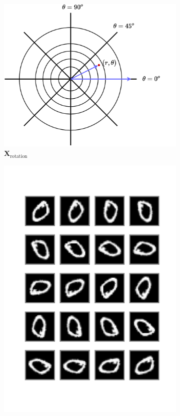 \documentclass[../../book-main.tex]{subfiles}
\begin{document}
\begin{example}
\begin{figure}[t]
    \begin{subfigure}[t]{0.3\textwidth}
        \centering
        \includegraphics[width=\textwidth]{figs_chap4/1d-rotation.pdf}
        \caption{$\bm{X}_{\text{rotation}}$}
    \end{subfigure}
    \hfill
    \begin{subfigure}[t]{0.3\textwidth}
        \centering
        \includegraphics[width=\textwidth]{figs_chap4/mnist1d_img0.pdf}

\end{subfigure}
\end{figure}
\end{example}
\end{document}
